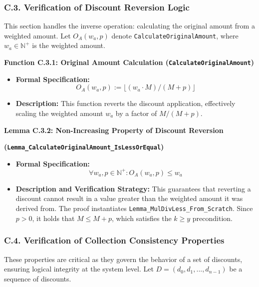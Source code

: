 \documentclass[
  english,
  onecolumn]{article}
\providecommand{\tightlist}{%
  \setlength{\itemsep}{0pt}\setlength{\parskip}{0pt}}
\begin{document}
\subsubsection{C.3. Verification of Discount Reversion
Logic}\label{c.3.-verification-of-discount-reversion-logic}

This section handles the inverse operation: calculating the original
amount from a weighted amount. Let \(O_A(w_a, p)\) denote
\texttt{CalculateOriginalAmount}, where \(w_a \in \mathbb{N}^+\) is the
weighted amount.

\textbf{Function C.3.1: Original Amount Calculation
(\texttt{CalculateOriginalAmount})}

\begin{itemize}
\tightlist
\item
  \textbf{Formal Specification:}
  \[ O_A(w_a, p) := \lfloor (w_a \cdot M) / (M + p) \rfloor \]
\item
  \textbf{Description:} This function reverts the discount application,
  effectively scaling the weighted amount \(w_a\) by a factor of
  \(M / (M + p)\).
\end{itemize}

\textbf{Lemma C.3.2: Non-Increasing Property of Discount Reversion}

\textbf{(\texttt{Lemma\_CalculateOriginalAmount\_IsLessOrEqual})}

\begin{itemize}
\tightlist
\item
  \textbf{Formal Specification:}
  \[ \forall w_a, p \in \mathbb{N}^+ : O_A(w_a, p) \le w_a \]
\item
  \textbf{Description and Verification Strategy:} This guarantees that
  reverting a discount cannot result in a value greater than the
  weighted amount it was derived from. The proof instantiates
  \texttt{Lemma\_MulDivLess\_From\_Scratch}. Since \(p > 0\), it holds
  that \(M \le M + p\), which satisfies the \(k \ge y\) precondition.
\end{itemize}

\subsubsection{C.4. Verification of Collection Consistency
Properties}\label{c.4.-verification-of-collection-consistency-properties}

These properties are critical as they govern the behavior of a set of
discounts, ensuring logical integrity at the system level. Let
\(D = (d_0, d_1, ..., d_{n-1})\) be a sequence of discounts.
\end{document}
